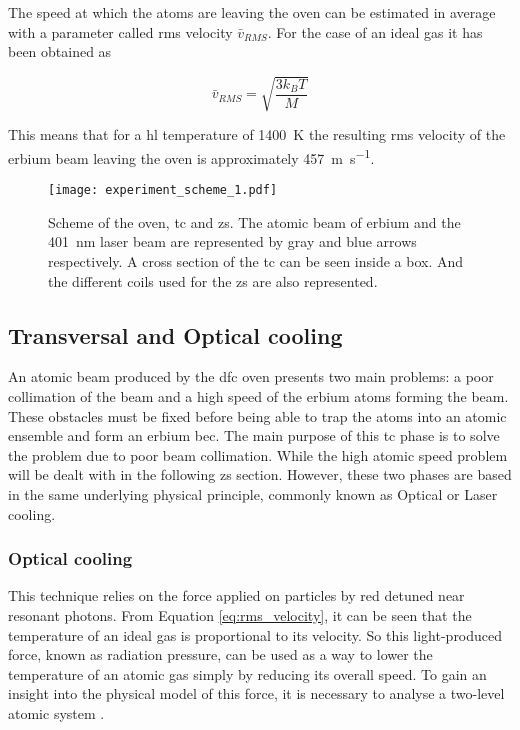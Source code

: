The speed at which the atoms are leaving the oven can be estimated in average with a parameter called \ac{rms} velocity $\bar{v}_{RMS}$. For the case of an ideal gas it has been obtained as \cite{Hansch1975}

\begin{equation}\label{eq:rms_velocity}
	\bar{v}_{RMS} = \sqrt{\frac{3 k_B T}{M}}
\end{equation}

This means that for a \ac{hl} temperature of \SI{1400}{\kelvin} the resulting \ac{rms} velocity of the erbium beam leaving the oven is approximately \SI{457}{\meter\per\second}.



\begin{figure}[!htbp]\centering
	\texttt{[image: experiment\_scheme\_1.pdf]}
	\caption[Oven, \acl{tc} and \acl{zs} schemes]{Scheme of the oven, \acl{tc} and \acl{zs}. The atomic beam of erbium and the \SI{401}{\nano\meter} laser beam are represented by gray and blue arrows respectively. A cross section of the \acl{tc} can be seen inside a box. And the different coils used for the \acl{zs} are also represented.}\label{fig:experiment_scheme_1}
\end{figure}



\subsection{Transversal and Optical cooling}

An atomic beam produced by the \ac{dfc} oven presents two main problems: a poor collimation of the beam and a high speed of the erbium atoms forming the beam. These obstacles must be fixed before being able to trap the atoms into an atomic ensemble and form an erbium \ac{bec}. The main purpose of this \Acf{tc} phase is to solve the problem due to poor beam collimation. While the high atomic speed problem will be dealt with in the following \Acl{zs} section. However, these two phases are based in the same underlying physical principle, commonly known as Optical or Laser cooling. 

\subsubsection{Optical cooling}

This technique relies on the force applied on particles by red detuned near resonant photons. From Equation \eqref{eq:rms_velocity}, it can be seen that the temperature of an ideal gas is proportional to its velocity. So this light-produced force, known as radiation pressure, can be used as a way to lower the temperature of an atomic gas simply by reducing its overall speed. To gain an insight into the physical model of this force, it is necessary to analyse a two-level atomic system  \cite{Metcalf1999}.

